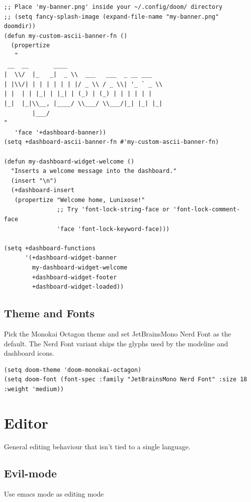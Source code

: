 \documentclass[11pt]{article}
\begin{document}
\begin{verbatim}
;; Place 'my-banner.png' inside your ~/.config/doom/ directory
;; (setq fancy-splash-image (expand-file-name "my-banner.png" doomdir))
(defun my-custom-ascii-banner-fn ()
  (propertize
   "
 __  __       ____
|  \\/  |_   _|  _ \\  ___   ___  _ __ ___
| |\\/| | | | | | | |/ _ \\ / _ \\| '_ ` _ \\
| |  | | |_| | |_| | (_) | (_) | | | | | |
|_|  |_|\\__, |____/ \\___/ \\___/|_| |_| |_|
        |___/
"
   'face '+dashboard-banner))
(setq +dashboard-ascii-banner-fn #'my-custom-ascii-banner-fn)

(defun my-dashboard-widget-welcome ()
  "Inserts a welcome message into the dashboard."
  (insert "\n")
  (+dashboard-insert
   (propertize "Welcome home, Lunixose!"
               ;; Try 'font-lock-string-face or 'font-lock-comment-face
               'face 'font-lock-keyword-face)))

(setq +dashboard-functions
      '(+dashboard-widget-banner
        my-dashboard-widget-welcome
        +dashboard-widget-footer
        +dashboard-widget-loaded))
\end{verbatim}
\subsection{Theme and Fonts}
\label{sec:org7053c1a}
Pick the Monokai Octagon theme and set JetBrainsMono Nerd Font as the
default. The Nerd Font variant ships the glyphs used by the modeline
and dashboard icons.

\begin{verbatim}
(setq doom-theme 'doom-monokai-octagon)
(setq doom-font (font-spec :family "JetBrainsMono Nerd Font" :size 18 :weight 'medium))
\end{verbatim}
\section{Editor}
\label{sec:org95ce70f}
General editing behaviour that isn't tied to a single language.
\subsection{Evil-mode}
\label{sec:org6225f31}
Use emacs mode as editing mode
\end{document}
